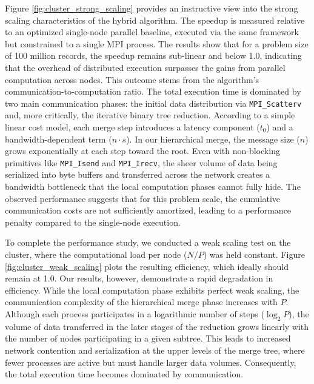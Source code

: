 \documentclass[10pt]{article}
\newcommand{\code}[1]{\texttt{#1}}
\begin{document}
Figure \ref{fig:cluster_strong_scaling} provides an instructive view into the strong scaling characteristics of the hybrid algorithm. The speedup is measured relative to an optimized single-node parallel baseline, executed via the same framework but constrained to a single MPI process. The results show that for a problem size of 100 million records, the speedup remains sub-linear and below 1.0, indicating that the overhead of distributed execution surpasses the gains from parallel computation across nodes. This outcome stems from the algorithm's communication-to-computation ratio. The total execution time is dominated by two main communication phases: the initial data distribution via \code{MPI\_Scatterv} and, more critically, the iterative binary tree reduction. According to a simple linear cost model, each merge step introduces a latency component ($t_0$) and a bandwidth-dependent term ($n \cdot s$). In our hierarchical merge, the message size ($n$) grows exponentially at each step toward the root. Even with non-blocking primitives like \code{MPI\_Isend} and \code{MPI\_Irecv}, the sheer volume of data being serialized into byte buffers and transferred across the network creates a bandwidth bottleneck that the local computation phases cannot fully hide. The observed performance suggests that for this problem scale, the cumulative communication costs are not sufficiently amortized, leading to a performance penalty compared to the single-node execution.

To complete the performance study, we conducted a weak scaling test on the cluster, where the computational load per node ($N/P$) was held constant. Figure \ref{fig:cluster_weak_scaling} plots the resulting efficiency, which ideally should remain at 1.0. Our results, however, demonstrate a rapid degradation in efficiency. While the local computation phase exhibits perfect weak scaling, the communication complexity of the hierarchical merge phase increases with $P$. Although each process participates in a logarithmic number of steps ($\log_2 P$), the volume of data transferred in the later stages of the reduction grows linearly with the number of nodes participating in a given subtree. This leads to increased network contention and serialization at the upper levels of the merge tree, where fewer processes are active but must handle larger data volumes. Consequently, the total execution time becomes dominated by communication.
\end{document}
